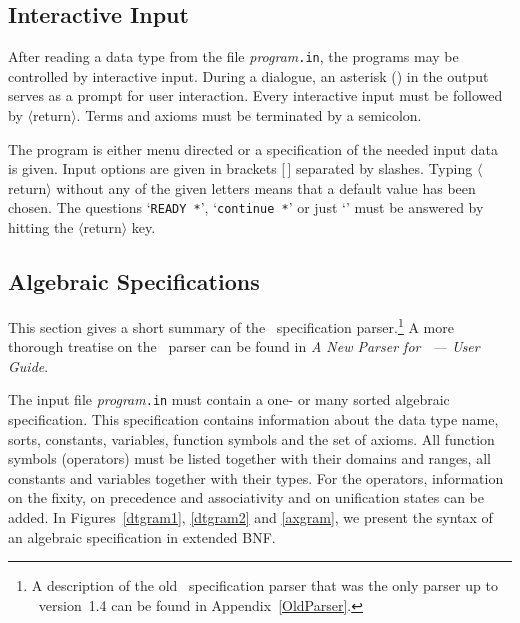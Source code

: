 \subsection{Interactive Input}
After reading a data type from the file {\it program}{\tt .in}, 
the programs may be controlled by interactive input.
During a dialogue, an asterisk ({\tt *}) in the
output serves as a prompt for user interaction.
Every interactive input must be followed by $\langle$return$\rangle$.
Terms and axioms must be terminated by a semicolon.

The program is either menu directed or a specification of the needed input 
data is given.
Input options are given in brackets [\,] separated by slashes.
Typing $\langle$return$\rangle$ without any of the given letters means that
a default value has been chosen.
The questions `{\tt READY *}', `{\tt continue *}'  or just `{\tt *}' must
be answered by hitting the $\langle$return$\rangle$ key.

\subsection{Algebraic Specifications}
This section gives a short summary of the \redux\  specification
parser.\footnote{A description of the old \redux\  specification parser
that was the only parser up to \redux\  version~1.4 can be found in
Appendix~\ref{OldParser}.}
A more thorough treatise on the \redux\  parser can be found in
{\em A New Parser for \redux\  --- User Guide}.

The input file  {\it program}{\tt .in} must contain a one- or 
many sorted algebraic specification.
This specification contains information about the data type
name, sorts, constants, variables, function symbols and the set of
axioms.
All function symbols (operators) must be 
listed together with their domains and ranges, all constants and variables 
together with their types. 
For the operators, information on the fixity, on precedence and
associativity and on unification states can be added.
In Figures~\ref{dtgram1}, \ref{dtgram2} and \ref{axgram},
we present the syntax of an algebraic specification in extended BNF.




